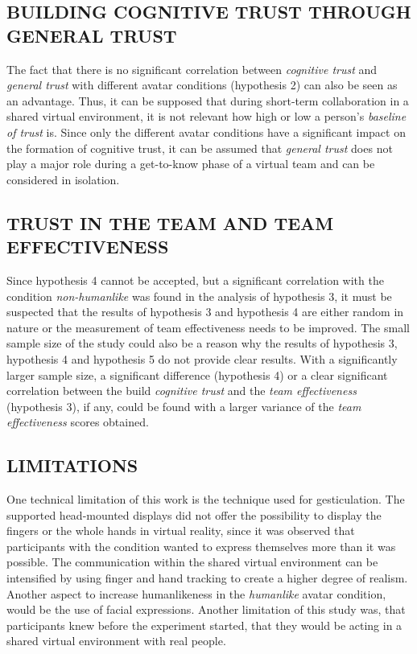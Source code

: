 \documentclass[sigchi]{acmart}
\begin{document}
\subsection{BUILDING COGNITIVE TRUST THROUGH GENERAL TRUST}
The fact that there is no significant correlation between \textit{cognitive trust} and \textit{general trust} with different avatar conditions (hypothesis 2) can also be seen as an advantage.
Thus, it can be supposed that during short-term collaboration in a shared virtual environment, it is not relevant how high or low a person's \textit{baseline of trust} is. 
Since only the different avatar conditions have a significant impact on the formation of cognitive trust, it can be assumed that \textit{general trust} does not play a major role during a get-to-know phase of a virtual team and can be considered in isolation. %

\subsection{TRUST IN THE TEAM AND TEAM EFFECTIVENESS}
Since hypothesis 4 cannot be accepted, but a significant correlation with the condition \textit{non-humanlike} was found in the analysis of hypothesis 3, it must be suspected that the results of hypothesis 3 and hypothesis 4 are either random in nature or the measurement of team effectiveness needs to be improved.
The small sample size of the study could also be a reason why the results of hypothesis 3, hypothesis 4 and hypothesis 5 do not provide clear results. With a significantly larger sample size, a significant difference (hypothesis 4) or a clear significant correlation between the build \textit{cognitive trust} and the \textit{team effectiveness} (hypothesis 3), if any, could be found with a larger variance of the \textit{team effectiveness} scores obtained.

\subsection{LIMITATIONS}
One technical limitation of this work is the technique used for gesticulation. The supported head-mounted displays did not offer the possibility to display the fingers or the whole hands in virtual reality, since it was observed that participants with the condition  wanted to express themselves more than it was possible. The communication within the shared virtual environment can be intensified by using finger and hand tracking to create a higher degree of realism. Another aspect to increase humanlikeness in the \textit{humanlike} avatar condition, would be the use of facial expressions.
Another limitation of this study was, that participants knew before the experiment started, that they would be acting in a shared virtual environment with real people. %
\end{document}
